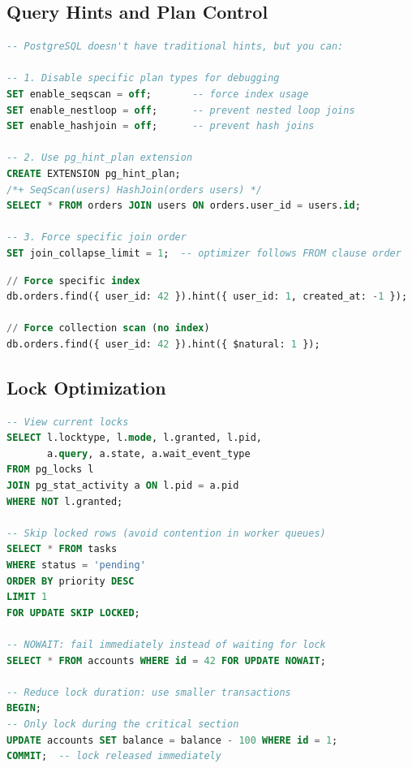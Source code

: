 \documentclass[12pt,a4paper]{article}
\begin{document}
\subsection{Query Hints and Plan Control}

\begin{lstlisting}[language=SQL, caption={PostgreSQL query hints}]
-- PostgreSQL doesn't have traditional hints, but you can:

-- 1. Disable specific plan types for debugging
SET enable_seqscan = off;       -- force index usage
SET enable_nestloop = off;      -- prevent nested loop joins
SET enable_hashjoin = off;      -- prevent hash joins

-- 2. Use pg_hint_plan extension
CREATE EXTENSION pg_hint_plan;
/*+ SeqScan(users) HashJoin(orders users) */
SELECT * FROM orders JOIN users ON orders.user_id = users.id;

-- 3. Force specific join order
SET join_collapse_limit = 1;  -- optimizer follows FROM clause order
\end{lstlisting}

\begin{lstlisting}[language=SQL, caption={MongoDB query hints}]
// Force specific index
db.orders.find({ user_id: 42 }).hint({ user_id: 1, created_at: -1 });

// Force collection scan (no index)
db.orders.find({ user_id: 42 }).hint({ $natural: 1 });
\end{lstlisting}

\subsection{Lock Optimization}

\begin{lstlisting}[language=SQL, caption={PostgreSQL lock management}]
-- View current locks
SELECT l.locktype, l.mode, l.granted, l.pid,
       a.query, a.state, a.wait_event_type
FROM pg_locks l
JOIN pg_stat_activity a ON l.pid = a.pid
WHERE NOT l.granted;

-- Skip locked rows (avoid contention in worker queues)
SELECT * FROM tasks
WHERE status = 'pending'
ORDER BY priority DESC
LIMIT 1
FOR UPDATE SKIP LOCKED;

-- NOWAIT: fail immediately instead of waiting for lock
SELECT * FROM accounts WHERE id = 42 FOR UPDATE NOWAIT;

-- Reduce lock duration: use smaller transactions
BEGIN;
-- Only lock during the critical section
UPDATE accounts SET balance = balance - 100 WHERE id = 1;
COMMIT;  -- lock released immediately
\end{lstlisting}
\end{document}
